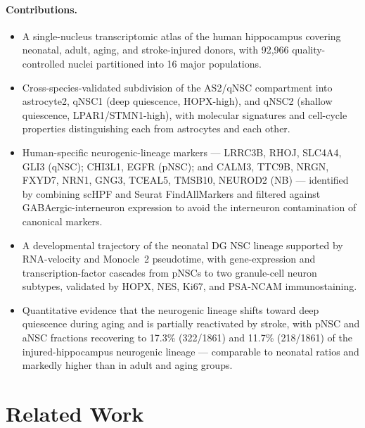 \paragraph{Contributions.}
\begin{itemize}
    \item A single-nucleus transcriptomic atlas of the human hippocampus covering neonatal, adult, aging, and stroke-injured donors, with 92{,}966 quality-controlled nuclei partitioned into 16 major populations.
    \item Cross-species-validated subdivision of the AS2/qNSC compartment into astrocyte2, qNSC1 (deep quiescence, HOPX-high), and qNSC2 (shallow quiescence, LPAR1/STMN1-high), with molecular signatures and cell-cycle properties distinguishing each from astrocytes and each other.
    \item Human-specific neurogenic-lineage markers --- LRRC3B, RHOJ, SLC4A4, GLI3 (qNSC); CHI3L1, EGFR (pNSC); and CALM3, TTC9B, NRGN, FXYD7, NRN1, GNG3, TCEAL5, TMSB10, NEUROD2 (NB) --- identified by combining scHPF and Seurat FindAllMarkers and filtered against GABAergic-interneuron expression to avoid the interneuron contamination of canonical markers.
    \item A developmental trajectory of the neonatal DG NSC lineage supported by RNA-velocity and Monocle~2 pseudotime, with gene-expression and transcription-factor cascades from pNSCs to two granule-cell neuron subtypes, validated by HOPX, NES, Ki67, and PSA-NCAM immunostaining.
    \item Quantitative evidence that the neurogenic lineage shifts toward deep quiescence during aging and is partially reactivated by stroke, with pNSC and aNSC fractions recovering to 17.3\% (322/1861) and 11.7\% (218/1861) of the injured-hippocampus neurogenic lineage --- comparable to neonatal ratios and markedly higher than in adult and aging groups.
\end{itemize}

\section{Related Work}

